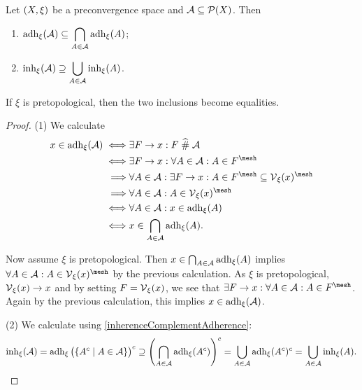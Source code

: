 \begin{proposition}
Let $\sSet{X,\xi}$ be a preconvergence space and $\mathcal{A}\subseteq \operatorname{\mathcal{P}}(X)$. Then
\begin{enumerate}
\item $\displaystyle \operatorname{adh}_\xi(\mathcal{A}) \subseteq \bigcap_{A\in\mathcal{A}}\operatorname{adh}_\xi(A)$;
\item $\displaystyle \operatorname{inh}_\xi(\mathcal{A}) \supseteq \bigcup_{A\in\mathcal{A}}\operatorname{inh}_\xi(A)$.
\end{enumerate}
If $\xi$ is pretopological, then the two inclusions become equalities.
\end{proposition}
\begin{proof}
(1) We calculate
\begin{align*}
x\in\adh_\xi(\mathcal{A}) \iff& \exists F\to x: F\amesh \mathcal{A} \\
\iff& \exists F\to x: \forall A\in\mathcal{A}: A\in F^\mesh \\
\implies& \forall A\in\mathcal{A}: \exists F\to x: A\in F^\mesh \subseteq \vicinity_\xi(x)^\mesh \\
\implies& \forall A\in\mathcal{A}: A\in \vicinity_\xi(x)^\mesh \\
\iff& \forall A\in\mathcal{A}: x\in \adh_\xi(A) \\
\iff& x\in \bigcap_{A\in\mathcal{A}}\adh_\xi(A).
\end{align*}

Now assume $\xi$ is pretopological. Then $x\in \bigcap_{A\in\mathcal{A}}\operatorname{adh}_\xi(A)$ implies $\forall A\in\mathcal{A}: A\in \vicinity_\xi(x)^\mesh$ by the previous calculation. As $\xi$ is pretopological, $\operatorname{\mathcal{V}}_\xi(x) \to x$ and by setting $F = \operatorname{\mathcal{V}}_\xi(x)$, we see that $\exists F\to x: \forall A\in\mathcal{A}: A\in F^\mesh$. Again by the previous calculation, this implies $x\in \operatorname{adh}_\xi(\mathcal{A})$.

(2) We calculate using \ref{inherenceComplementAdherence}:
\[ \inh_\xi(\mathcal{A}) = \adh_\xi\big(\setbuilder{A^c}{A\in \mathcal{A}}\big)^c \supseteq \left(\bigcap_{A\in\mathcal{A}}\adh_{\xi}(A^c)\right)^c = \bigcup_{A\in\mathcal{A}}\adh_{\xi}(A^c)^c = \bigcup_{A\in\mathcal{A}}\inh_{\xi}(A). \]
\end{proof}


